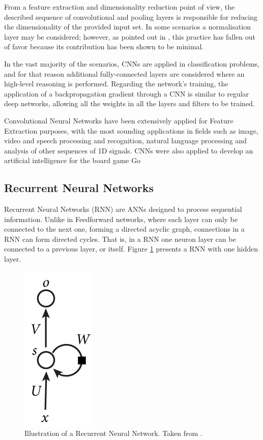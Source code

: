 \documentclass[9pt,journal,compsoc]{IEEEtran}
\begin{document}
From a feature extraction and dimensionality reduction point of view, the described sequence of convolutional and pooling layers is responsible for reducing the dimensionality of the provided input set. In some scenarios a normalisation layer may be considered; however, as pointed out in \cite{cs2312017convolutional}, this practice has fallen out of favor because its contribution has been shown to be minimal.

In the vast majority of the scenarios, CNNs are applied in classification problems, and for that reason additional fully-connected layers are considered where an high-level reasoning is performed. Regarding the network's training, the application of a backpropagation gradient through a CNN is similar to regular deep networks, allowing all the weights in all the layers and filters to be trained.

Convolutional Neural Networks have been extensively applied for Feature Extraction purposes, with the most sounding applications in fields such as image\cite{lawrence1997face, krizhevsky2012imagenet}, video\cite{karpathy2014large} and speech processing and recognition\cite{lecun1995convolutional, abdel2012applying}, natural language processing\cite{hu2014convolutional} and analysis of other sequences of 1D signals. CNNs were also applied to develop an artificial intelligence for the board game Go\cite{clark2014teaching, maddison2014move}

\subsection{Recurrent Neural Networks}

Recurrent Neural Networks (RNN) are ANNs designed to process sequential information. Unlike in Feedforward networks, where each layer can only be connected to the next one, forming a directed acyclic graph, connections in a RNN can form directed cycles. That is, in a RNN one neuron layer can be connected to a previous layer, or itself. Figure \ref{recurrent_ann} presents a RNN with one hidden layer.

\begin{figure}[ht]
	\centering
	\includegraphics[scale=0.2]{recurrent_ann.png}
	\caption{Illustration of a Recurrent Neural Network. Taken from \cite{deep2015recurrent}.}
	\label{recurrent_ann}
\end{figure}
\end{document}
